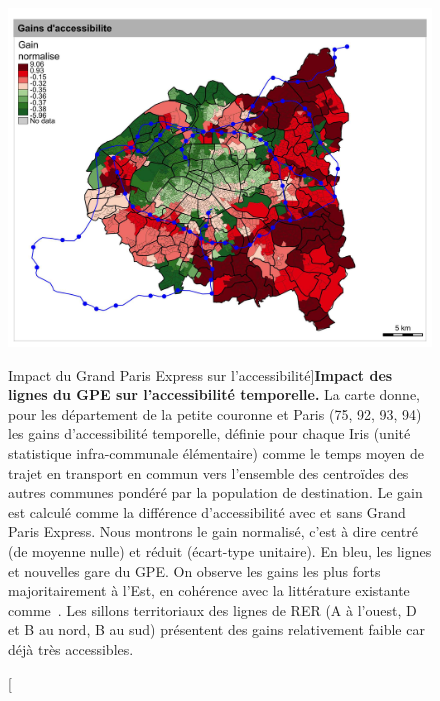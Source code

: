\begin{figure}%
	\includegraphics[width=\linewidth]{Figures/Final/1-2-1-fig-casestudies-gpe.jpg}
	\caption[Impact of \emph{Grand Paris Express} on accessibility][Impact du Grand Paris Express sur l'accessibilité]{\label{fig:casestudies:gpe}}{\textbf{Impact des lignes du GPE sur l'accessibilité temporelle.} La carte donne, pour les département de la petite couronne et Paris (75, 92, 93, 94) les gains d'accessibilité temporelle, définie pour chaque Iris (unité statistique infra-communale élémentaire) comme le temps moyen de trajet en transport en commun vers l'ensemble des centroïdes des autres communes pondéré par la population de destination. Le gain est calculé comme la différence d'accessibilité avec et sans Grand Paris Express. Nous montrons le gain normalisé, c'est à dire centré (de moyenne nulle) et réduit (écart-type unitaire). En bleu, les lignes et nouvelles gare du GPE. On observe les gains les plus forts majoritairement à l'Est, en cohérence avec la littérature existante comme~\cite{beaucire2013grand}. Les sillons territoriaux des lignes de RER (A à l'ouest, D et B au nord, B au sud) présentent des gains relativement faible car déjà très accessibles.\label{fig:casestudies:gpe}}
\end{figure}



